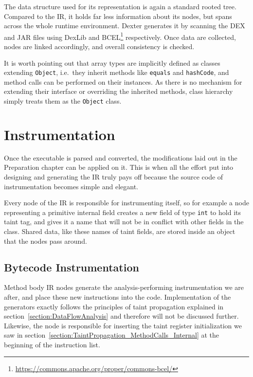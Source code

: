 \documentclass[12pt,twoside,notitlepage]{report}
\newcommand{\weblink}[1] {\footnote{\scriptsize\url{#1}}}
\begin{document}
The data structure used for its representation is again a standard rooted tree. Compared to the IR, it holds far less information about its nodes, but spans across the whole runtime environment. Dexter generates it by scanning the DEX and JAR files using DexLib and BCEL\weblink{https://commons.apache.org/proper/commons-bcel/} respectively. Once data are collected, nodes are linked accordingly, and overall consistency is checked.

It is worth pointing out that array types are implicitly defined as classes extending \verb$Object$, i.e.\ they inherit methods like \verb$equals$ and \verb$hashCode$, and method calls can be performed on their instances. As there is no mechanism for extending their interface or overriding the inherited methods, class hierarchy simply treats them as the \verb$Object$ class.

\section{Instrumentation}

Once the executable is parsed and converted, the modifications laid out in the Preparation chapter can be applied on it. This is when all the effort put into designing and generating the IR truly pays off because the source code of instrumentation becomes simple and elegant. 

Every node of the IR is responsible for instrumenting itself, so for example a node representing a primitive internal field creates a new field of type \verb$int$ to hold its taint tag, and gives it a name that will not be in conflict with other fields in the class. Shared data, like these names of taint fields, are stored inside an object that the nodes pass around.

\subsection{Bytecode Instrumentation}

Method body IR nodes generate the analysis-performing instrumentation we are after, and place these new instructions into the code. Implementation of the generators exactly follows the principles of taint propagation explained in section~\ref{section:DataFlowAnalysis} and therefore will not be discussed further. Likewise, the node is responsible for inserting the taint register initialization we saw in section~\ref{section:TaintPropagation_MethodCalls_Internal} at the beginning of the instruction list.
\end{document}
